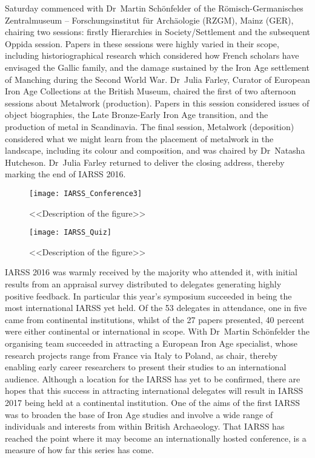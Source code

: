 \documentclass[ngerman,english]{ijsra}
\begin{document}
Saturday commenced with Dr~Martin Schönfelder of the \foreignlanguage{ngerman}{Römisch\--German\-isches Zentralmuseum --
 Forschungsinstitut für Archäologie} (RZGM), Mainz (GER), chairing two sessions: firstly Hierarchies in
  Society/Settlement and the subsequent Oppida session. Papers in these sessions were highly varied in
   their scope, including historiographical research which considered how French scholars have envisaged
    the Gallic family, and the damage sustained by the Iron Age settlement of Manching during the Second World War. 
Dr~Julia Farley, Curator of European Iron Age Collections at the British Museum, chaired the first of two afternoon sessions about Metalwork (production).  Papers in this session considered issues of object biographies, the Late Bronze-Early Iron Age transition, and the production of metal in Scandinavia. 
The final session, Metalwork (deposition) considered what we might learn from the placement of metalwork in the landscape, including its colour and composition, and was chaired by Dr~Natasha Hutcheson. 
Dr~Julia Farley returned to deliver the closing address, thereby marking the end of IARSS 2016.

\begin{wrapfigure}{O}[.05\textwidth]{0.7\linewidth}
\texttt{[image: IARSS\_Conference3]}
\caption{<<Description of the figure>>}
\label{fig:IARSS_Conference3}
\texttt{[image: IARSS\_Quiz]}
\caption{<<Description of the figure>>}
\label{fig:IARSS_Quiz}
\end{wrapfigure} 
IARSS 2016 was warmly received by the majority who attended it, with initial results from an appraisal survey distributed to delegates generating highly positive feedback. In particular this year’s symposium succeeded in being the most international IARSS yet held. 
Of the 53 delegates in attendance, one in five came from continental institutions, whilst of the 27 papers presented, 40 percent were either continental or international in scope. With Dr~Martin Schönfelder the organising team succeeded in attracting a European Iron Age specialist, whose research projects range from France via Italy to Poland, as chair, thereby enabling early career researchers to present their studies to an international audience. Although a location for the  IARSS has yet to be confirmed, there are hopes that this success in attracting international delegates will result in IARSS 2017 being held at a continental institution. One of the aims of the first IARSS was to broaden the base of Iron Age studies and involve a wide range of individuals and interests from within British Archaeology. 
That IARSS has reached the point where it may become an internationally hosted conference, is a measure of how far this series has come.
\end{document}
